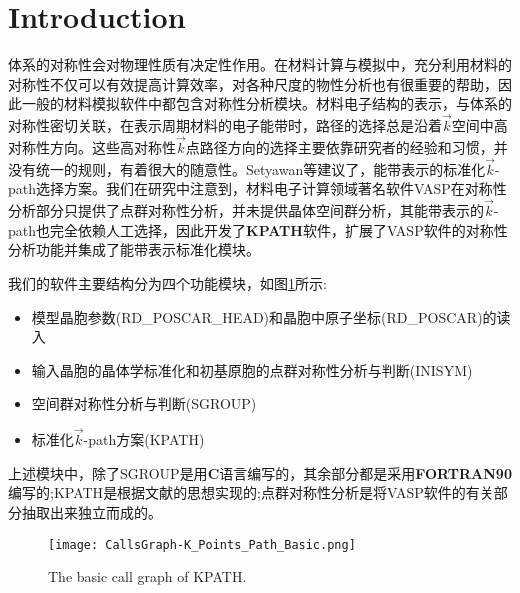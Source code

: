 \section{Introduction}
体系的对称性会对物理性质有决定性作用。在材料计算与模拟中，充分利用材料的对称性不仅可以有效提高计算效率，对各种尺度的物性分析也有很重要的帮助，因此一般的材料模拟软件中都包含对称性分析模块。材料电子结构的表示，与体系的对称性密切关联，在表示周期材料的电子能带时，路径的选择总是沿着$\vec k$空间中高对称性方向。这些高对称性$\vec k$点路径方向的选择主要依靠研究者的经验和习惯，并没有统一的规则，有着很大的随意性。\textrm{Setyawan}等建议了，能带表示的标准化$\vec k$-\textrm{path}选择方案。我们在研究中注意到，材料电子计算领域著名软件\textrm{VASP}在对称性分析部分只提供了点群对称性分析，并未提供晶体空间群分析，其能带表示的$\vec k$-\textrm{path}也完全依赖人工选择，因此开发了\textbf{KPATH}软件，扩展了\textrm{VASP}软件的对称性分析功能并集成了能带表示标准化模块。

我们的软件主要结构分为四个功能模块，如图\ref{Call_graph:basic}所示:
\begin{itemize}
	\item 模型晶胞参数(\textrm{RD\_POSCAR\_HEAD})和晶胞中原子坐标(\textrm{RD\_POSCAR})的读入
	\item 输入晶胞的晶体学标准化和初基原胞的点群对称性分析与判断(\textrm{INISYM})
	\item 空间群对称性分析与判断(SGROUP)
	\item 标准化$\vec k$-\textrm{path}方案(\textrm{KPATH})
\end{itemize}
上述模块中，除了\textrm{SGROUP}是用\textbf{C}语言编写的，其余部分都是采用\textbf{FORTRAN90}编写的;\textrm{KPATH}是根据文献\cite{CMS49-299_2010}的思想实现的;点群对称性分析是将\textrm{VASP}软件的有关部分抽取出来独立而成的。
\begin{figure}[h!]
\centering
\texttt{[image: CallsGraph-K\_Points\_Path\_Basic.png]}
\caption{\small The basic call graph of KPATH.}%
\label{Call_graph:basic}
\end{figure}

